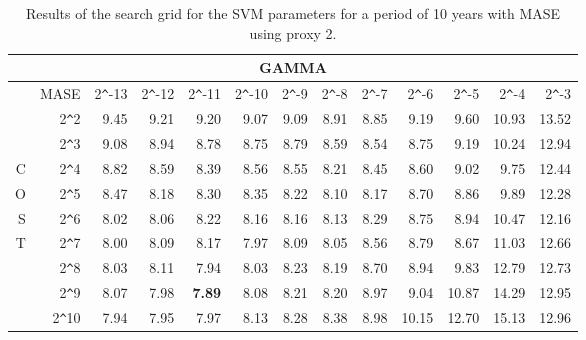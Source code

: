 \begin{table}[h!]
\centering
\begin{adjustbox}{width=\textwidth}
\begin{tabular}{|r|r|rrrrrrrrrrr|}
\hline
\multicolumn{13}{|c|}{GAMMA} \tabularnewline
\hline
 &MASE& 2\verb|^|-13 & 2\verb|^|-12 & 2\verb|^|-11 & 2\verb|^|-10 & 2\verb|^|-9 & 2\verb|^|-8 & 2\verb|^|-7 & 2\verb|^|-6 & 2\verb|^|-5 & 2\verb|^|-4 & 2\verb|^|-3 \\ 
  \hline
  &2\verb|^|2 & 9.45 & 9.21 & 9.20 & 9.07 & 9.09 & 8.91 & 8.85 & 9.19 & 9.60 & 10.93 & 13.52 \\ 
  &2\verb|^|3 & 9.08 & 8.94 & 8.78 & 8.75 & 8.79 & 8.59 & 8.54 & 8.75 & 9.19 & 10.24 & 12.94 \\ 
  C&2\verb|^|4 & 8.82 & 8.59 & 8.39 & 8.56 & 8.55 & 8.21 & 8.45 & 8.60 & 9.02 & 9.75 & 12.44 \\ 
  O&2\verb|^|5 & 8.47 & 8.18 & 8.30 & 8.35 & 8.22 & 8.10 & 8.17 & 8.70 & 8.86 & 9.89 & 12.28 \\ 
  S&2\verb|^|6 & 8.02 & 8.06 & 8.22 & 8.16 & 8.16 & 8.13 & 8.29 & 8.75 & 8.94 & 10.47 & 12.16 \\ 
  T&2\verb|^|7 & 8.00 & 8.09 & 8.17 & 7.97 & 8.09 & 8.05 & 8.56 & 8.79 & 8.67 & 11.03 & 12.66 \\ 
  &2\verb|^|8 & 8.03 & 8.11 & 7.94 & 8.03 & 8.23 & 8.19 & 8.70 & 8.94 & 9.83 & 12.79 & 12.73 \\ 
  &2\verb|^|9 & 8.07 & 7.98 & \textbf{7.89} & 8.08 & 8.21 & 8.20 & 8.97 & 9.04 & 10.87 & 14.29 & 12.95 \\ 
  &2\verb|^|10 & 7.94 & 7.95 & 7.97 & 8.13 & 8.28 & 8.38 & 8.98 & 10.15 & 12.70 & 15.13 & 12.96 \\ 
   \hline
\end{tabular}
\end{adjustbox}
\caption{Results of the search grid for the SVM parameters for a period of 10 years with MASE using proxy 2.}
\end{table}